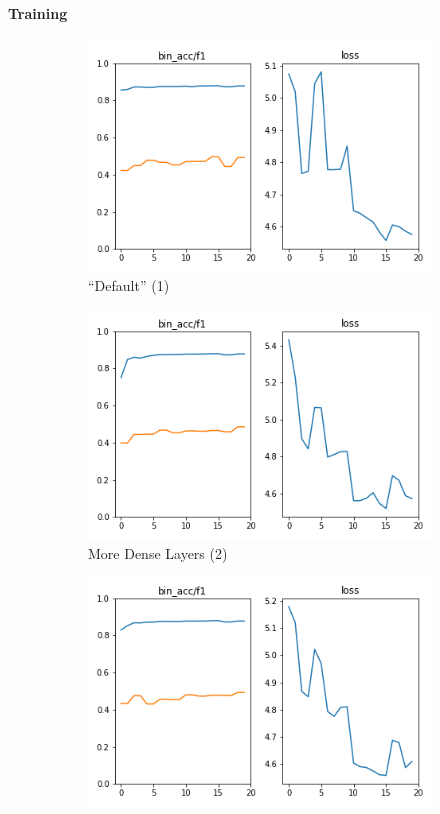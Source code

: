 \begin{frame}
	\frametitle{\secttitle}
	\framesubtitle{Training}
	\begin{figure}
		\centering
		\begin{subfigure}{0.5\textwidth}
			\caption{``Default'' (1)}
			\centering
			\includegraphics[width=0.8\linewidth]{images/default.png}
		\end{subfigure}%
		\begin{subfigure}{0.5\textwidth}
			\centering
			\caption{More Dense Layers (2)}
			\includegraphics[width=0.8\linewidth]{images/inc_deep_conn_lay.png}
		\end{subfigure}
		\begin{subfigure}{0.5\textwidth}
			\centering
			\includegraphics[width=0.8\linewidth]{images/even_more_conv.png}

\end{subfigure}
\end{figure}
\end{frame}
